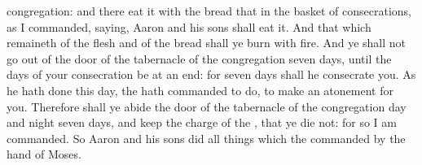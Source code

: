 {congregation: and there
eat it with the
bread that
{} in the
basket of
consecrations, as I
commanded,
saying,
Aaron and his
sons shall
eat it.
And that which
remaineth of the
flesh and of the
bread shall ye
burn with
fire.
And ye shall not go
out of the
door of the
tabernacle of the
congregation
{}
seven
days, until the
days of your
consecration be at an
end: for
seven
days shall he
consecrate you.
As he hath
done this
day,
{} the
{} hath
commanded to
do, to make an
atonement for you.
Therefore shall ye
abide
{} the
door of the
tabernacle of the
congregation
day and
night
seven
days, and
keep the
charge of the
{}, that ye
die not: for so I am
commanded.
So
Aaron and his
sons
did all
things which the
{}
commanded by the
hand of
Moses.

}
